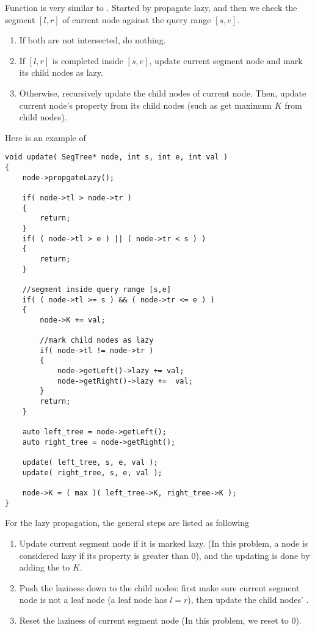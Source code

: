 Function  is very similar to . Started by propagate lazy, and then we check the segment $[l,r]$ of current node against the query range $[s,e]$.

\begin{enumerate}
\item If both are not intersected, do nothing.
\item If $[l,r]$ is completed inside $[s,e]$, update current segment node and mark its child nodes as lazy.
\item Otherwise, recursively update the child nodes of current node. Then, update current node's property from its child nodes (such as get maximum $K$ from child nodes).
\end{enumerate}

Here is an example of 

\begin{lstlisting}[style=customc]
void update( SegTree* node, int s, int e, int val )
{
    node->propgateLazy();

    if( node->tl > node->tr )
    {
        return;
    }
    if( ( node->tl > e ) || ( node->tr < s ) )
    {
        return;
    }

    //segment inside query range [s,e]
    if( ( node->tl >= s ) && ( node->tr <= e ) )
    {
        node->K += val;

        //mark child nodes as lazy
        if( node->tl != node->tr )
        {
            node->getLeft()->lazy += val;
            node->getRight()->lazy +=  val;
        }
        return;
    }

    auto left_tree = node->getLeft();
    auto right_tree = node->getRight();

    update( left_tree, s, e, val );
    update( right_tree, s, e, val );

    node->K = ( max )( left_tree->K, right_tree->K );
}
\end{lstlisting}

For the lazy propagation, the general steps are listed as following
\begin{enumerate}
\item Update current segment node if it is marked lazy. (In this problem, a node is considered lazy if its  property is greater than 0), and the updating is done by adding the  to $K$.

\item Push the laziness down to the child nodes: first make sure current segment node is not a leaf node (a leaf node has $l = r$), then update the child nodes' .

\item Reset the laziness of current segment node (In this problem, we reset  to 0).
\end{enumerate}

